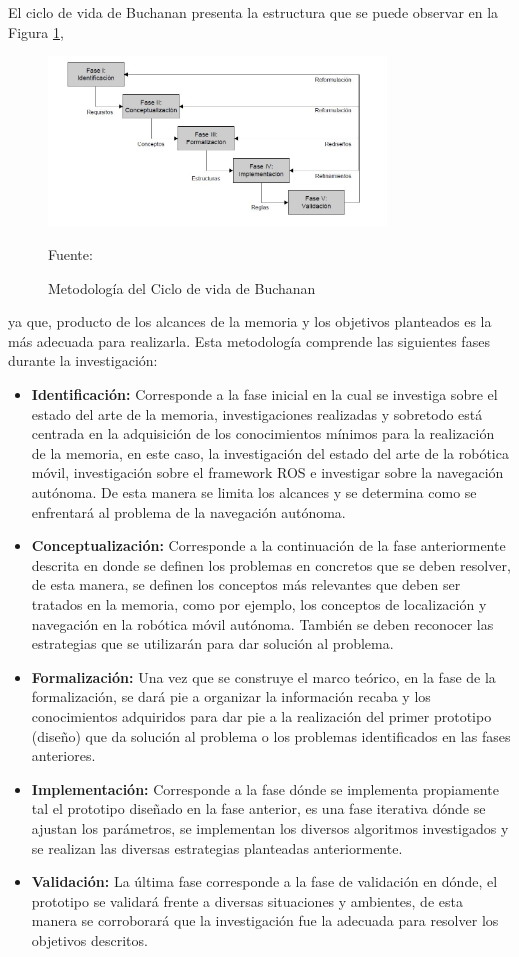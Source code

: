 El ciclo de vida de Buchanan presenta la estructura que se puede observar en la Figura \ref{fig:Buchanan},
\begin{figure}[h]
    \centering
    \includegraphics[width=0.8\textwidth]{figures/01definicion_problema/metodologia_Bu.JPG}
    \caption{\label{fig:Buchanan} Metodología del Ciclo de vida de Buchanan} 
    Fuente: \cite{buchanan_2000}
\end{figure}
ya que, producto de los alcances de la memoria y los objetivos planteados es la más adecuada para realizarla. Esta metodología comprende las siguientes fases durante la investigación:
\begin{itemize}
    \item \textbf{Identificación: }Corresponde a la fase inicial en la cual se investiga sobre el estado del arte de la memoria, investigaciones realizadas y sobretodo está centrada en la adquisición de los conocimientos mínimos para la realización de la memoria, en este caso, la investigación del estado del arte de la robótica móvil, investigación sobre el framework ROS e investigar sobre la navegación autónoma. De esta manera se limita los alcances y se determina como se enfrentará al problema de la navegación autónoma.
    \item \textbf{Conceptualización: }Corresponde a la continuación de la fase anteriormente descrita en donde se definen los problemas en concretos que se deben resolver, de esta manera, se definen los conceptos más relevantes que deben ser tratados en la memoria, como por ejemplo, los conceptos de localización y navegación en la robótica móvil autónoma. También se deben reconocer las estrategias que se utilizarán para dar solución al problema.
    \item \textbf{Formalización: }Una vez que se construye el marco teórico, en la fase de la formalización, se dará pie a organizar la información recaba y los conocimientos adquiridos para dar pie a la realización del primer prototipo (diseño) que da solución al problema o los problemas identificados en las fases anteriores.
    \item \textbf{Implementación: }Corresponde a la fase dónde se implementa propiamente tal el prototipo diseñado en la fase anterior, es una fase iterativa dónde se ajustan los parámetros, se implementan los diversos algoritmos investigados y se realizan las diversas estrategias planteadas anteriormente. 
    \item \textbf{Validación: }La última fase corresponde a la fase de validación en dónde, el prototipo se validará frente a diversas situaciones y ambientes, de esta manera se corroborará que la investigación fue la adecuada para resolver los objetivos descritos.
\end{itemize}



